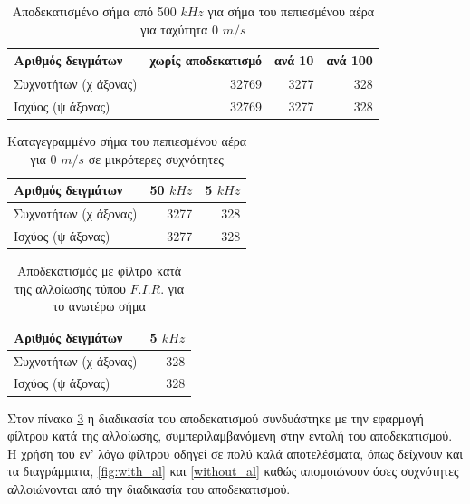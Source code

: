 \documentclass[breaklines=true, 12pt]{article}
\begin{document}
{{{\begin{table}[htbp]
\caption{\label{some_ref}Αποδεκατισμένο σήμα από 500 \(kHz\) για σήμα του πεπιεσμένου αέρα για ταχύτητα 0 \(m/s\)}
\centering
\begin{tabular}{lrrr}
\hline
Αριθμός δειγμάτων & χωρίς αποδεκατισμό & ανά 10 & ανά 100\\[0pt]
\hline
Συχνοτήτων (χ άξονας) & 32769 & 3277 & 328\\[0pt]
Ισχύος (ψ άξονας) & 32769 & 3277 & 328\\[0pt]
\end{tabular}
\end{table}

\begin{table}[htbp]
\caption{\label{rec_low_fs_ref}Καταγεγραμμένο σήμα του πεπιεσμένου αέρα για 0 \(m/s\) σε μικρότερες συχνότητες}
\centering
\begin{tabular}{lrr}
Αριθμός δειγμάτων & 50 \(kHz\) & 5 \(kHz\)\\[0pt]
\hline
Συχνοτήτων (χ άξονας) & 3277 & 328\\[0pt]
Ισχύος (ψ άξονας) & 3277 & 328\\[0pt]
\end{tabular}
\end{table}

\begin{table}[htbp]
\caption{\label{dec_fir_ref}Αποδεκατισμός με φίλτρο κατά της αλλοίωσης τύπου \(F.I.R.\) για το ανωτέρω σήμα}
\centering
\begin{tabular}{lr}
Αριθμός δειγμάτων & 5 \(kHz\)\\[0pt]
\hline
\hline
Συχνοτήτων (χ άξονας) & 328\\[0pt]
Ισχύος (ψ άξονας) & 328\\[0pt]
\end{tabular}
\end{table}

Στον πίνακα \ref{dec_fir_ref} η διαδικασία του αποδεκατισμού συνδυάστηκε με
την εφαρμογή φίλτρου κατά της αλλοίωσης, συμπεριλαμβανόμενη στην εντολή
του αποδεκατισμού. Η χρήση του εν' λόγω φίλτρου οδηγεί σε πολύ καλά αποτελέσματα,
όπως δείχνουν και τα διαγράμματα, \ref{fig:with_al} και \ref{without_al} καθώς απομοιώνουν
όσες συχνότητες αλλοιώνονται από την διαδικασία του αποδεκατισμού.

}}}
\end{document}
